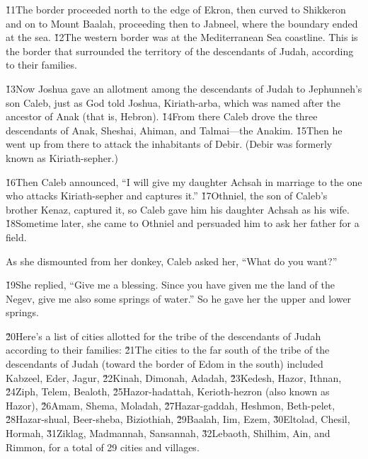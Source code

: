 \v{11}The border proceeded north to the edge of Ekron, then curved to Shikkeron and on to Mount Baalah, proceeding then to Jabneel, where the boundary ended at the sea. \v{12}The western border was at the Mediterranean Sea coastline. This is the border that surrounded the territory of the descendants of Judah, according to their families.

\v{13}Now Joshua gave an allotment among the descendants of Judah to Jephunneh's son Caleb, just as God told Joshua, Kiriath-arba, which was named after the ancestor of Anak (that is, Hebron). \v{14}From there Caleb drove the three descendants of Anak, Sheshai, Ahiman, and Talmai---the Anakim. \v{15}Then he went up from there to attack the inhabitants of Debir. (Debir was formerly known as Kiriath-sepher.)

\v{16}Then Caleb announced, ``I will give my daughter Achsah in marriage to the one who attacks Kiriath-sepher and captures it.'' \v{17}Othniel, the son of Caleb's brother Kenaz, captured it, so Caleb gave him his daughter Achsah as his wife. \v{18}Sometime later, she came to Othniel and persuaded him to ask her father for a field.

As she dismounted from her donkey, Caleb asked her, ``What do you want?''

\v{19}She replied, ``Give me a blessing. Since you have given me the land of the Negev, give me also some springs of water.'' So he gave her the upper and lower springs.

\v{20}Here's a list of cities allotted for the tribe of the descendants of Judah according to their families: \v{21}The cities to the far south of the tribe of the descendants of Judah (toward the border of Edom in the south) included Kabzeel, Eder, Jagur, \v{22}Kinah, Dimonah, Adadah, \v{23}Kedesh, Hazor, Ithnan, \v{24}Ziph, Telem, Bealoth, \v{25}Hazor-hadattah, Kerioth-hezron (also known as Hazor), \v{26}Amam, Shema, Moladah, \v{27}Hazar-gaddah, Heshmon, Beth-pelet, \v{28}Hazar-shual, Beer-sheba, Biziothiah, \v{29}Baalah, Iim, Ezem, \v{30}Eltolad, Chesil, Hormah, \v{31}Ziklag, Madmannah, Sansannah, \v{32}Lebaoth, Shilhim, Ain, and Rimmon, for a total of 29 cities and villages.

